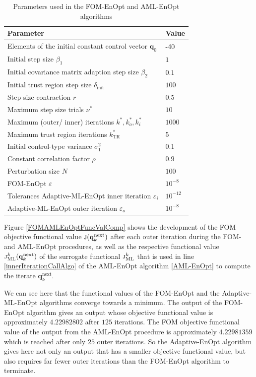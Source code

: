 \begin{table}[h]
\caption{\label{FOMAMLEnOptParameters}Parameters used in the FOM-EnOpt and AML-EnOpt algorithms}
\centering
\begin{tabular}{ll}
\hline
Parameter & Value\\
\hline
Elements of the initial constant control vector $\mathbf{q}_0$ & -40\\
Initial step size $\beta_1$ & $1$\\
Initial covariance matrix adaption step size $\beta_2$ & $0.1$\\
Initial trust region step size $\delta_\mathrm{init}$ & $100$\\
Step size contraction $r$ & $0.5$\\
Maximum step size trials $\nu^*$ & $10$\\
Maximum (outer/ inner) iterations $k^*, k^*_o, k^*_i$ & $1000$\\
Maximum trust region iterations $k^*_\mathrm{TR}$ & $5$\\
Initial control-type variance $\sigma^2_1$ & $0.1$\\
Constant correlation factor $\rho$ & $0.9$\\
Perturbation size $N$ & $100$\\
FOM-EnOpt $\varepsilon$ & $10^{-8}$\\
Tolerances Adaptive-ML-EnOpt inner iteration $\varepsilon_i$ & $10^{-12}$\\
Adaptive-ML-EnOpt outer iteration $\varepsilon_o$ & $10^{-8}$\\
\hline
\end{tabular}
\end{table}

Figure \ref{FOMAMLEnOptFuncValComp} shows the development of the FOM objective functional value $\Call{j}{\mathbf{q}^\mathrm{next}_k}$ after each outer iteration during the FOM- and AML-EnOpt procedures, as well as the respective functional value $\Call{j$^k_\mathrm{ML}$}{\mathbf{q}^\mathrm{next}_k}$ of the surrogate functional $\textproc{j$_\mathrm{ML}^k$}$ that is used in line \ref{innerIterationCallAlgo} of the AML-EnOpt algorithm \ref{AML-EnOpt} to compute the iterate $\mathbf{q}^\mathrm{next}_k$.%

We can see here that the functional values of the FOM-EnOpt and the Adaptive-ML-EnOpt algorithms converge towards a minimum. The output of the FOM-EnOpt algorithm gives an output whose objective functional value is approximately $4.22982802$ after $125$ iterations. The FOM objective functional value of the output from the AML-EnOpt procedure is approximately $4.22981359$ which is reached after only $25$ outer iterations. So the Adaptive-EnOpt algorithm gives here not only an output that has a smaller objective functional value, but also requires far fewer outer iterations than the FOM-EnOpt algorithm to terminate.\\

